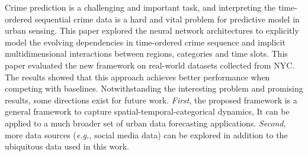 Crime prediction is a challenging and important task, and interpreting 
the time-ordered sequential crime data is a hard and vital
problem for predictive model in urban sensing. This paper explored
the neural network architectures to explicitly model the evolving
dependencies in time-ordered crime sequence and implicit multidimensional 
interactions between regions, categories and time slots.
This paper evaluated the new framework on real-world datasets collected
from NYC. The results showed that this approach achieves better
performance when competing with baselines.
Notwithstanding the interesting problem and promising results,
some directions exist for future work. \emph{First}, the proposed framework is a
 general framework to capture spatial-temporal-categorical dynamics,
It can be applied to a much broader set of urban
data forecasting applications. \emph{Second}, more data sources (\emph{e.g.,} 
social media data) can be explored in addition to the ubiquitous
data used in this work.